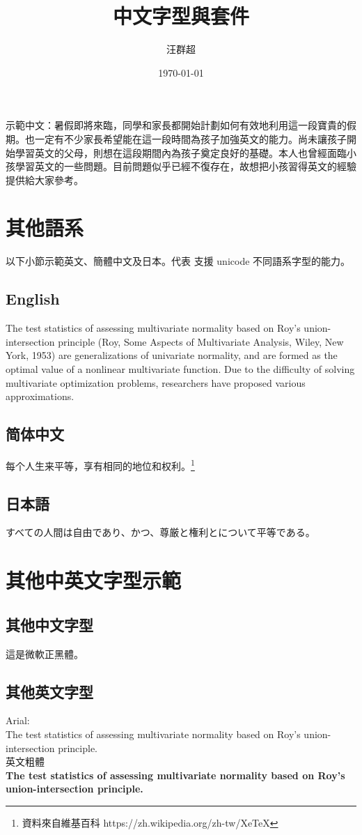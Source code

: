 \documentclass[12pt, a4paper]{article}
\title{{\MB 中文字型與套件}}			%
\author{{\SM 汪群超}}					%
\date{{\C \today} }
\begin{document}
\maketitle
\fontsize{12}{22pt}\selectfont %

示範中文：暑假即將來臨，同學和家長都開始計劃如何有效地利用這一段寶貴的假期。也一定有不少家長希望能在這一段時間為孩子加強英文的能力。尚未讓孩子開始學習英文的父母，則想在這段期間內為孩子奠定良好的基礎。本人也曾經面臨小孩學習英文的一些問題。目前問題似乎已經不復存在，故想把小孩習得英文的經驗提供給大家參考。

\section{其他語系}
以下小節示範英文、簡體中文及日本。代表 \XeLaTeX 支援 unicode 不同語系字型的能力。
\subsection{English}
The test statistics of assessing multivariate normality based on Roy’s union-intersection principle (Roy, Some Aspects of Multivariate Analysis, Wiley, New York, 1953) are generalizations of univariate normality, and are formed as the optimal value of a nonlinear multivariate function. Due to the difficulty of solving multivariate optimization problems, researchers have proposed various approximations.


\subsection{简体中文}
每个人生来平等，享有相同的地位和权利。\footnote{資料來自維基百科 https://zh.wikipedia.org/zh-tw/XeTeX}

\subsection{日本語}
すべての人間は自由であり、かつ、尊厳と権利とについて平等である。

\section{其他中英文字型示範}
\subsection{其他中文字型}
{\MB 這是微軟正黑體。}
\subsection{其他英文字型}
{\A Arial:}\\
{\A The test statistics of assessing multivariate normality based on Roy's union-intersection principle.}\\

英文粗體\\
\textbf{ The test statistics of assessing multivariate normality based on Roy's union-intersection principle.}\\
\end{document}
